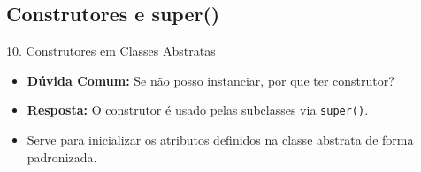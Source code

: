 \documentclass[9pt]{beamer}
\begin{document}
\subsection{Construtores e super()}
\begin{frame}{10. Construtores em Classes Abstratas}
    \begin{itemize}
        \item \textbf{Dúvida Comum:} Se não posso instanciar, por que ter construtor?
        \item \textbf{Resposta:} O construtor é usado pelas subclasses via \texttt{super()}.
        \item Serve para inicializar os atributos definidos na classe abstrata de forma padronizada.
    \end{itemize}
\end{frame}
\end{document}
